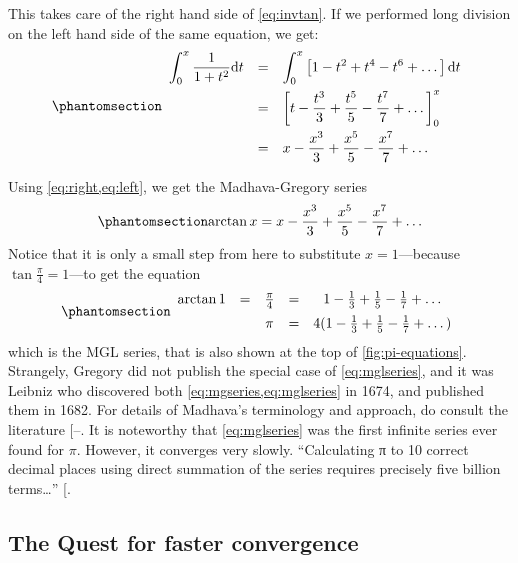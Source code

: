 \documentclass[
  a4paper,
]{article}
\begin{document}
This takes care of the right hand side of \cref{eq:invtan}. If we
performed long division on the left hand side of the same equation, we
get: \begin{equation}\phantomsection\label{eq:left}{
\begin{array}{rcl}
\displaystyle \int_{0}^{x}\frac{1}{1+ t^2}\mathrm{d}t %
& = & \displaystyle \int_{0}^{x}%
\left[ 1 - t^2 + t^4 - t^6 +\dots \right] \mathrm{d}t \\[1em]
& = & \displaystyle \left[ t - \frac{t^3}{3} + \frac{t^5}{5} - \frac{t^7}{7}+ \dots \right]_{0}^{x}\\[1em]
& = & \displaystyle x - \frac{x^3}{3} + \frac{x^5}{5} - \frac{x^7}{7}+ \dots
\end{array}
}\end{equation}

Using \cref{eq:right,eq:left}, we get the Madhava-Gregory series
\begin{equation}\phantomsection\label{eq:mgseries}{
\arctan x = x - \frac{x^3}{3} + \frac{x^5}{5} - \frac{x^7}{7} + \dots
}\end{equation} Notice that it is only a small step from here to
substitute \(x = 1\)---because \(\tan\frac{\pi}{4} = 1\)---to get the
equation \begin{equation}\phantomsection\label{eq:mglseries}{
\begin{array}{ccccc}
\arctan 1 & = & \frac{\pi}{4} & = & 1 - \frac{1}{3} + \frac{1}{5} - \frac{1}{7} + \dots \\[0.5em]
&  & \pi & = & 4(1 - \frac{1}{3} + \frac{1}{5} - \frac{1}{7} + \dots)
\end{array}
}\end{equation} which is the MGL series, that is also shown at the top
of \cref{fig:pi-equations}. Strangely, Gregory did not publish the
special case of \cref{eq:mglseries}, and it was Leibniz who discovered
both \cref{eq:mgseries,eq:mglseries} in 1674, and published them in
1682. For details of Madhava's terminology and approach, do consult the
literature
{[}--\citeproc{ref-joseph2011}{20}{]}. It is
noteworthy that \cref{eq:mglseries} was the first infinite series ever
found for \(\pi\). However, it converges very slowly. ``Calculating π to
10 correct decimal places using direct summation of the series requires
precisely five billion terms\ldots{}''
{[}\citeproc{ref-leibniz-pi}{22}{]}.

\subsection{The Quest for faster
convergence}\label{the-quest-for-faster-convergence}
\end{document}
